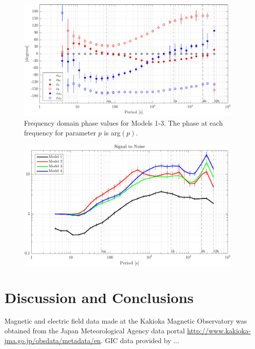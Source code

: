 \documentclass[draft,linenumbers]{agujournal2018}
\begin{document}
\begin{figure}[h]
\centering
\includegraphics[width=\textwidth]{figures/plot_TF_aves_Phi-options-1.pdf}
\caption{Frequency domain phase values for Models 1-3. The phase at each frequency for parameter $p$ is arg$(p)$.}
\label{Phi}
\end{figure}

\begin{figure}[h]
\centering
\includegraphics[width=\textwidth]{figures/plot_TF_aves_SN-options-1.pdf}
\caption{}
\label{Phi}
\end{figure}

\section{Discussion and Conclusions}


\acknowledgments
Magnetic and electric field data made at the Kakioka Magnetic Observatory was obtained from the Japan Meteorological Agency data portal \url{http://www.kakioka-jma.go.jp/obsdata/metadata/en}. GIC data provided by ...






\end{document}
